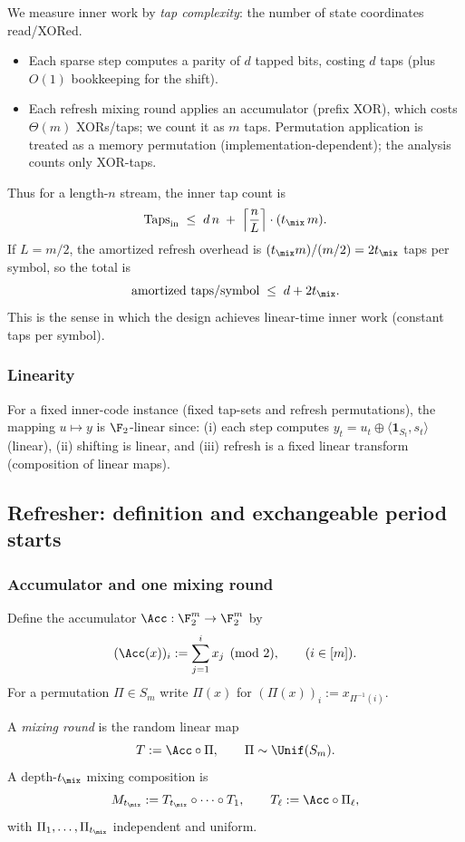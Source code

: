 We measure inner work by \emph{tap complexity}: the number of state coordinates read/XORed.
\begin{itemize}
\item Each sparse step computes a parity of \(d\) tapped bits, costing \(d\) taps (plus \(O(1)\) bookkeeping for the shift).
\item Each refresh mixing round applies an accumulator (prefix XOR), which costs \(\Theta(m)\) XORs/taps; we count it as \(m\) taps.
Permutation application is treated as a memory permutation (implementation-dependent); the analysis counts only XOR-taps.
\end{itemize}
Thus for a length-\(n\) stream, the inner tap count is
\[
\mathrm{Taps}_{\mathrm{in}} \;\le\; d\,n \;+\; \Big\lceil\frac{n}{L}\Big\rceil\cdot (t_{\mix}\,m).
\]
If \(L=m/2\), the amortized refresh overhead is \((t_{\mix}m)/(m/2)=2t_{\mix}\) taps per symbol, so the total is
\[
\text{amortized taps/symbol} \;\le\; d + 2t_{\mix}.
\]
This is the sense in which the design achieves linear-time inner work (constant taps per symbol).

\subsubsection*{Linearity}

For a fixed inner-code instance (fixed tap-sets and refresh permutations),
the mapping \(u\mapsto y\) is \(\F_2\)-linear since:
(i) each step computes \(y_t=u_t\oplus\langle \mathbf{1}_{S_t}, s_t\rangle\) (linear),
(ii) shifting is linear, and
(iii) refresh is a fixed linear transform (composition of linear maps).

\subsection{Refresher: definition and exchangeable period starts}
\label{sec:refresher-definition}

\subsubsection*{Accumulator and one mixing round}

Define the accumulator \(\Acc:\F_2^m\to\F_2^m\) by
\[
(\Acc(x))_i := \sum_{j=1}^i x_j \pmod 2,
\qquad (i\in[m]).
\]
For a permutation \(\Pi\in S_m\) write \(\Pi(x)\) for \((\Pi(x))_i := x_{\Pi^{-1}(i)}\).

A \emph{mixing round} is the random linear map
\[
T := \Acc\circ \Pi,\qquad \Pi\sim \Unif(S_m).
\]
A depth-\(t_{\mix}\) mixing composition is
\[
M_{t_{\mix}} := T_{t_{\mix}}\circ \cdots \circ T_1,\qquad T_\ell:=\Acc\circ \Pi_\ell,
\]
with \(\Pi_1,\dots,\Pi_{t_{\mix}}\) independent and uniform.

